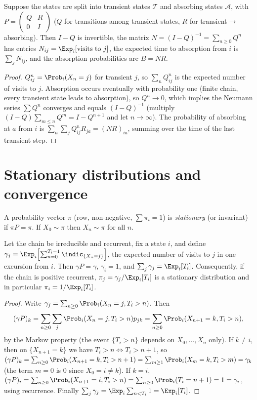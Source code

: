\begin{theorem}\label{thm:absorbing}
Suppose the states are split into transient states $\mathcal T$ and absorbing states
$\mathcal A$, with $P=\begin{pmatrix}Q&R\\0&I\end{pmatrix}$ ($Q$ for transitions among
transient states, $R$ for transient$\to$absorbing). Then $I-Q$ is invertible, the matrix
$N=(I-Q)^{-1}=\sum_{n\ge0}Q^n$ has entries $N_{ij}=\Exp_i[\text{visits to }j]$, the expected
time to absorption from $i$ is $\sum_jN_{ij}$, and the absorption probabilities are
$B=NR$.
\end{theorem}
\begin{proof}
$Q^n_{ij}=\Prob_i(X_n=j)$ for transient $j$, so $\sum_nQ^n_{ij}$ is the expected number
of visits to $j$. Absorption occurs eventually with probability one (finite chain, every
transient state leads to absorption), so $Q^n\to0$, which implies the Neumann series
$\sum Q^n$ converges and equals $(I-Q)^{-1}$ (multiply $(I-Q)\sum_{m\le n}Q^m=I-Q^{n+1}$
and let $n\to\infty$). The probability of absorbing at $a$ from $i$ is
$\sum_n\sum_jQ^n_{ij}R_{ja}=(NR)_{ia}$, summing over the time of the last transient step.
\end{proof}

\section{Stationary distributions and convergence}

\begin{definition}
A probability vector $\pi$ (row, non-negative, $\sum\pi_i=1$) is \emph{stationary} (or
invariant) if $\pi P=\pi$. If $X_0\sim\pi$ then $X_n\sim\pi$ for all $n$.
\end{definition}

\begin{theorem}\label{thm:stationary}
Let the chain be irreducible and recurrent, fix a state $i$, and define
$\gamma_j=\Exp_i\Bigl[\sum_{n=0}^{T_i-1}\indic_{\{X_n=j\}}\Bigr]$, the expected number of
visits to $j$ in one excursion from $i$. Then $\gamma P=\gamma$, $\gamma_i=1$, and
$\sum_j\gamma_j=\Exp_i[T_i]$. Consequently, if the chain is positive recurrent,
$\pi_j=\gamma_j/\Exp_i[T_i]$ is a stationary distribution and in particular
$\pi_i=1/\Exp_i[T_i]$.
\end{theorem}
\begin{proof}
Write $\gamma_j=\sum_{n\ge0}\Prob_i(X_n=j,T_i>n)$. Then
\[
(\gamma P)_k=\sum_{n\ge0}\sum_j\Prob_i(X_n=j,T_i>n)p_{jk}=\sum_{n\ge0}\Prob_i(X_{n+1}=k,T_i>n),
\]
by the Markov property (the event $\{T_i>n\}$ depends on $X_0,\dots,X_n$ only). If
$k\ne i$, then on $\{X_{n+1}=k\}$ we have $T_i>n\iff T_i>n+1$, so
$(\gamma P)_k=\sum_{n\ge0}\Prob_i(X_{n+1}=k,T_i>n+1)=\sum_{m\ge1}\Prob_i(X_m=k,T_i>m)=\gamma_k$
(the term $m=0$ is $0$ since $X_0=i\ne k$). If $k=i$,
$(\gamma P)_i=\sum_{n\ge0}\Prob_i(X_{n+1}=i,T_i>n)=\sum_{n\ge0}\Prob_i(T_i=n+1)=1=\gamma_i$,
using recurrence. Finally $\sum_j\gamma_j=\Exp_i\sum_{n<T_i}1=\Exp_i[T_i]$.
\end{proof}

